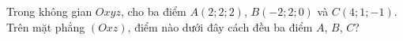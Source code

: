 \begin{ex}
Trong không gian $Oxyz$, cho ba điểm $A(2;2;2)$, $B(-2;2;0)$ và $C(4;1;-1)$. Trên mặt phẳng $(Oxz)$, điểm nào dưới đây cách đều ba điểm $A$, $B$, $C$?
\end{ex}
